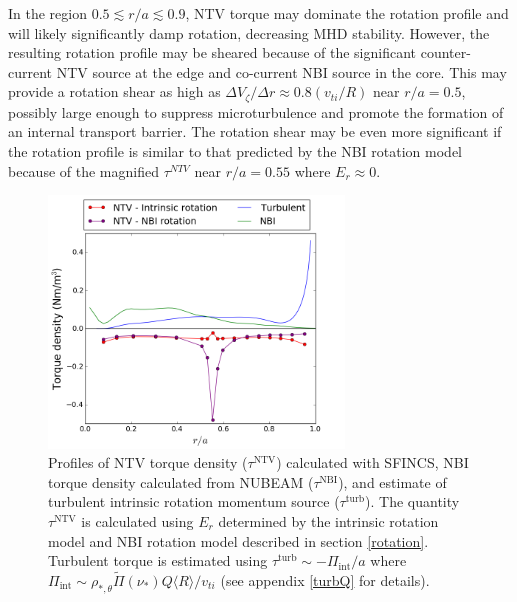 \documentclass[aip, pop, preprint]{revtex4-1}
\numberwithin{figure}{section}
\numberwithin{equation}{section}
\begin{document}
In the region $0.5 \lesssim r/a \lesssim 0.9$, NTV torque may dominate the rotation profile and will likely significantly damp rotation, decreasing MHD stability. However, the resulting rotation profile may be sheared because of the significant counter-current NTV source at the edge and co-current NBI source in the core. This may provide a rotation shear as high as $\Delta V_{\zeta}/ \Delta r \approx 0.8 (v_{ti}/R)$ near $r/a = 0.5$, possibly large enough to suppress microturbulence\cite{Hahm1994} and promote the formation of an internal transport barrier. The rotation shear may be even more significant if the rotation profile is similar to that predicted by the NBI rotation model because of the magnified $\tau^{NTV}$ near $r/a = 0.55$ where $E_r \approx 0$. 

\begin{figure}[h!]
\centering
\includegraphics[width=0.7\textwidth]{AllTorquePlot.png}
\caption{\label{fig:alltorque} Profiles of NTV torque density ($\tau^{\text{NTV}}$) calculated with SFINCS, NBI torque density calculated from NUBEAM ($\tau^{\text{NBI}}$), and estimate of turbulent intrinsic rotation momentum source ($\tau^{\text{turb}}$). The quantity $\tau^{\text{NTV}}$ is calculated using $E_r$ determined by the intrinsic rotation model and NBI rotation model described in section \ref{rotation}. Turbulent torque is estimated using $\tau^{\text{turb}} \sim -\Pi_{\text{int}}/a$ where $\Pi_{\text{int}} \sim \rho_{*, \theta} \widetilde{\Pi}(\nu_*) Q \langle R \rangle/v_{ti}$ (see appendix \ref{turbQ} for details).}
\end{figure}

\FloatBarrier
\end{document}
